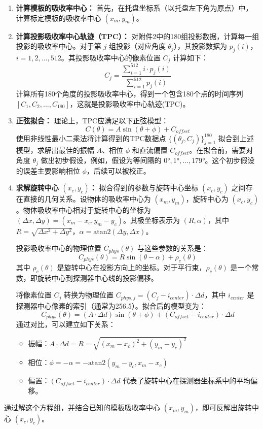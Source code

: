 \begin{enumerate}
    \item \textbf{计算模板的吸收率中心：} 首先，在托盘坐标系（以托盘左下角为原点）中，计算标定模板的吸收率中心 $(x_m,y_m)$。
    \item \textbf{计算投影吸收率中心轨迹（TPC）：} 对附件2中的180组投影数据，计算每一组投影的吸收率中心。对于第 $j$ 组投影（对应角度 $\theta_j$），其投影数据为 $p_j(i)$，$i=1,2,...,512$。其投影吸收率中心的像素位置 $C_j$ 计算如下：
       $$C_j=\frac{\sum_{i=1}^{512}i\cdot p_j(i)}{\sum_{i=1}^{512}p_j(i)}$$
       计算所有180个角度的投影吸收率中心，得到一个包含180个点的时间序列 $[C_1,C_2,...,C_{180}]$，这就是投影吸收率中心轨迹(TPC)。
    \item \textbf{正弦拟合：} 理论上，TPC应满足以下正弦模型：
       $$C(\theta)=A\sin(\theta+\phi)+C_{offset}$$
       使用非线性最小二乘法将计算得到的TPC数据点 $\{(\theta_j,C_j)\}_{j=1}^{180}$ 拟合到上述模型，求解出最佳的振幅 $A$、相位 $\phi$ 和直流偏置 $C_{offset}$。在拟合前，需要对角度 $\theta_j$ 做出初步假设，例如，假设为等间隔的 $0°,1°,...,179°$。这个初步假设的误差主要影响相位 $\phi$，后续可以被校正。
    \item \textbf{求解旋转中心 $(x_c,y_c)$：} 拟合得到的参数与旋转中心坐标 $(x_c,y_c)$ 之间存在直接的几何关系。设物体的吸收率中心为 $(x_m,y_m)$，旋转中心为 $(x_c,y_c)$。物体吸收率中心相对于旋转中心的坐标为 $(\Delta x,\Delta y)=(x_m-x_c,y_m-y_c)$。其极坐标表示为 $(R,\alpha)$，其中 $R=\sqrt{\Delta x^2+\Delta y^2}$，$\alpha=\text{atan2}(\Delta y,\Delta x)$。
       
       投影吸收率中心的物理位置 $C_{phys}(\theta)$ 与这些参数的关系是：
       $$C_{phys}(\theta)=R\sin(\theta-\alpha)+\rho_c(\theta)$$
       其中 $\rho_c(\theta)$ 是旋转中心在投影方向上的坐标。对于平行束，$\rho_c(\theta)$ 是一个常数，即旋转中心到探测器中心线的投影偏移。
       
       将像素位置 $C_j$ 转换为物理位置 $C_{phys,j}=(C_j-i_{center})\cdot\Delta d$，其中 $i_{center}$ 是探测器中心像素的索引（通常为256.5）。拟合后的模型变为：
       $$C_{phys}(\theta)=(A\cdot\Delta d)\sin(\theta+\phi)+(C_{offset}-i_{center})\cdot\Delta d$$
       通过对比，可以建立如下关系：
       \begin{itemize}
           \item 振幅：$A\cdot\Delta d=R=\sqrt{(x_m-x_c)^2+(y_m-y_c)^2}$
           \item 相位：$\phi=-\alpha=-\text{atan2}(y_m-y_c,x_m-x_c)$
           \item 偏置：$(C_{offset}-i_{center})\cdot\Delta d$ 代表了旋转中心在探测器坐标系中的平均偏移。
       \end{itemize}
\end{enumerate}

通过解这个方程组，并结合已知的模板吸收率中心 $(x_m,y_m)$，即可反解出旋转中心 $(x_c,y_c)$。









